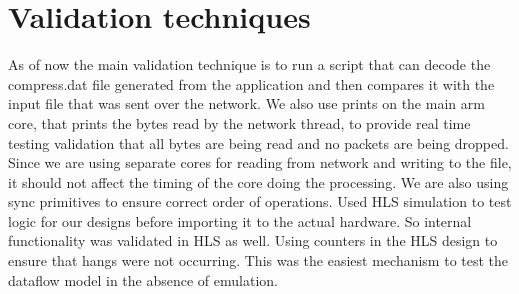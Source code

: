 \documentclass{article}
\begin{document}
\section{Validation techniques}
As of now the main validation technique is to run a script that can decode the compress.dat file generated from the application and then compares it with the input file that was sent over the network. 
\newline\newline
We also use prints on the main arm core, that prints the bytes read by the network thread, to provide real time testing validation that all bytes are being read and no packets are being dropped. 
\newline\newline
Since we are using separate cores for reading from network and writing to the file, it should not affect the timing of the core doing the processing. We are also using sync primitives to ensure correct order of operations.
\newline\newline
Used HLS simulation to test logic for our designs before importing it to the actual hardware. So internal functionality was validated in HLS as well. 
\newline\newline
Using counters in the HLS design to ensure that hangs were not occurring. This was the easiest mechanism to test the dataflow model in the absence of emulation.
\end{document}
